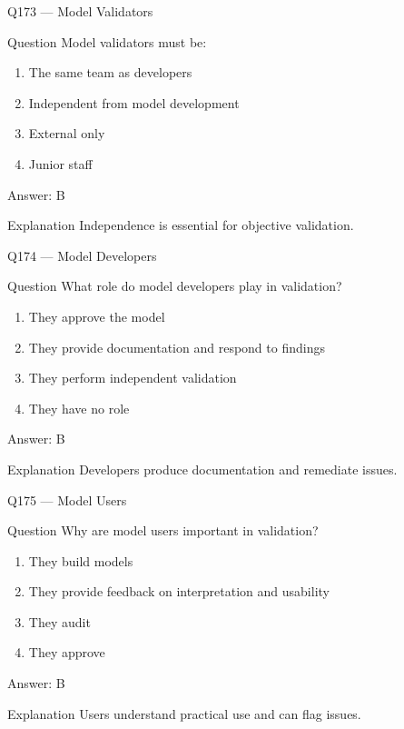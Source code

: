 \documentclass[aspectratio=169,8pt]{beamer}
\begin{document}
	\begin{frame}{Q173 --- Model Validators}
		\begin{block}{Question}
			Model validators must be:
		\end{block}
		\begin{enumerate}
			\item The same team as developers
			\item Independent from model development
			\item External only
			\item Junior staff
		\end{enumerate}
		\begin{exampleblock}{Answer: B}\end{exampleblock}
		\begin{block}{Explanation}
			Independence is essential for objective validation.
		\end{block}
	\end{frame}
	
	\begin{frame}{Q174 --- Model Developers}
		\begin{block}{Question}
			What role do model developers play in validation?
		\end{block}
		\begin{enumerate}
			\item They approve the model
			\item They provide documentation and respond to findings
			\item They perform independent validation
			\item They have no role
		\end{enumerate}
		\begin{exampleblock}{Answer: B}\end{exampleblock}
		\begin{block}{Explanation}
			Developers produce documentation and remediate issues.
		\end{block}
	\end{frame}
	
	\begin{frame}{Q175 --- Model Users}
		\begin{block}{Question}
			Why are model users important in validation?
		\end{block}
		\begin{enumerate}
			\item They build models
			\item They provide feedback on interpretation and usability
			\item They audit
			\item They approve
		\end{enumerate}
		\begin{exampleblock}{Answer: B}\end{exampleblock}
		\begin{block}{Explanation}
			Users understand practical use and can flag issues.
		\end{block}
	\end{frame}
	
\end{document}
